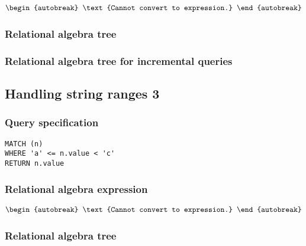 \begin{align*}
\begin{autobreak}
\text{Cannot convert to expression.}
\end{autobreak}
\end{align*}

\subsubsection*{Relational algebra tree}


\subsubsection*{Relational algebra tree for incremental queries}


\subsection{Handling string ranges 3}

\subsubsection*{Query specification}

\begin{lstlisting}
MATCH (n)
WHERE 'a' <= n.value < 'c'
RETURN n.value
\end{lstlisting}

\subsubsection*{Relational algebra expression}

\begin{align*}
\begin{autobreak}
\text{Cannot convert to expression.}
\end{autobreak}
\end{align*}

\subsubsection*{Relational algebra tree}


